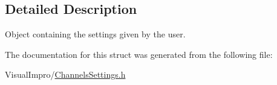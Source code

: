 

\subsection{Detailed Description}
Object containing the settings given by the user. 

The documentation for this struct was generated from the following file\+:\begin{DoxyCompactItemize}
\item 
Visual\+Impro/\mbox{\hyperlink{_channels_settings_8h}{Channels\+Settings.\+h}}\end{DoxyCompactItemize}
